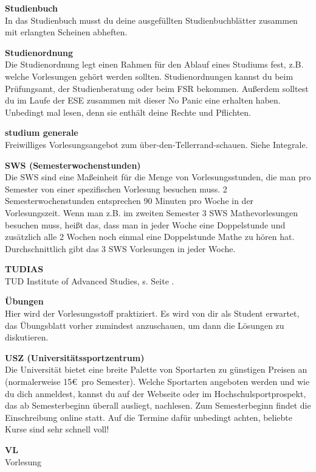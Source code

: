 \textbf{Studienbuch} \\
In das Studienbuch musst du deine ausgefüllten Studienbuchblätter zusammen mit erlangten Scheinen abheften.

\textbf{Studienordnung} \\
Die Studienordnung legt einen Rahmen für den Ablauf eines Studiums fest, z.B. welche Vorlesungen gehört werden sollten.
Studienordnungen kannst du beim Prüfungsamt, der Studienberatung oder beim FSR bekommen.
Außerdem solltest du im Laufe der ESE zusammen mit dieser No Panic eine erhalten haben.
Unbedingt mal lesen, denn sie enthält deine Rechte und Pflichten.

\textbf{studium generale} \\
Freiwilliges Vorlesungsangebot zum über-den-Tellerrand-schauen.
Siehe Integrale.

\textbf{SWS (Semesterwochenstunden)} \\
Die SWS sind eine Maßeinheit für die Menge von Vorlesungsstunden, die man pro Semester von einer spezifischen Vorlesung besuchen muss.
2 Semesterwochenstunden entsprechen 90 Minuten pro Woche in der Vorlesungszeit.
Wenn man z.B. im zweiten Semester 3 SWS Mathevorlesungen besuchen muss, heißt das, dass man in jeder Woche eine Doppelstunde und zusätzlich alle 2 Wochen noch einmal eine Doppelstunde Mathe zu hören hat.
Durchschnittlich gibt das 3 SWS Vorlesungen in jeder Woche.

\textbf{TUDIAS} \\
TUD Institute of Advanced Studies, s. Seite \pageref{sec:sprachausbildung}.

\textbf{Übungen} \\
Hier wird der Vorlesungsstoff praktiziert.
Es wird von dir als Student erwartet, das Übungsblatt vorher zumindest anzuschauen, um dann die Lösungen zu diskutieren.

\textbf{USZ (Universitätssportzentrum)} \\
Die Universität bietet eine breite Palette von Sportarten zu günstigen Preisen an (normalerweise 15\euro\ pro Semester).
Welche Sportarten angeboten werden und wie du dich anmeldest, kannst du auf der Webseite  oder im Hochschulsportprospekt, das ab Semesterbeginn überall ausliegt, nachlesen.
Zum Semesterbeginn findet die Einschreibung online statt.
Auf die Termine dafür unbedingt achten, beliebte Kurse sind sehr schnell voll!

\textbf{VL} \\
Vorlesung

